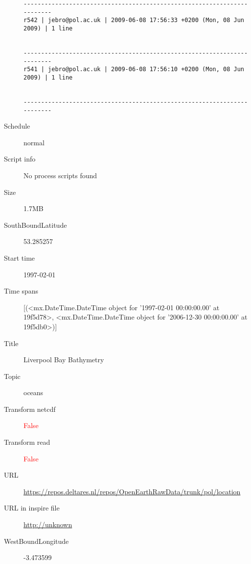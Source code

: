 \documentclass[9]{report}
\begin{document}
\begin{description}
\begin{verbatim}
------------------------------------------------------------------------
r542 | jebro@pol.ac.uk | 2009-06-08 17:56:33 +0200 (Mon, 08 Jun 2009) | 1 line


------------------------------------------------------------------------
r541 | jebro@pol.ac.uk | 2009-06-08 17:56:10 +0200 (Mon, 08 Jun 2009) | 1 line


------------------------------------------------------------------------

\end{verbatim}
  \item[Schedule] normal
  \item[Script info] No process scripts found
  \item[Size] 1.7MB
  \item[SouthBoundLatitude] 53.285257
  \item[Start time] 1997-02-01
  \item[Time spans] [(<mx.DateTime.DateTime object for '1997-02-01 00:00:00.00' at 19f5d78>, <mx.DateTime.DateTime object for '2006-12-30 00:00:00.00' at 19f5db0>)]
  \item[Title]  Liverpool Bay Bathymetry 
  \item[Topic] oceans
  \item[Transform netcdf] \textcolor{red}{False}
  \item[Transform read] \textcolor{red}{False}
  \item[URL] \href{https://repos.deltares.nl/repos/OpenEarthRawData/trunk/pol/location}{https://repos.deltares.nl/repos/OpenEarthRawData/trunk/pol/location}
  \item[URL in inspire file] \href{http://unknown}{http://unknown}
  \item[WestBoundLongitude] -3.473599
\end{description}
\end{document}
